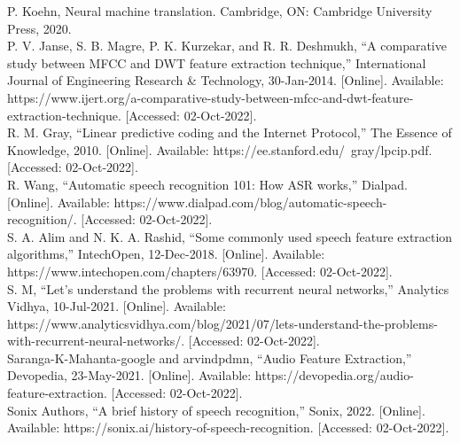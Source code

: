 \newline
P. Koehn, Neural machine translation. Cambridge, ON: Cambridge University Press, 2020.  \\
\newline
P. V. Janse, S. B. Magre, P. K. Kurzekar, and R. R. Deshmukh, “A comparative study between MFCC and DWT feature extraction technique,” International Journal of Engineering Research \& Technology, 30-Jan-2014. [Online]. \newline Available: https://www.ijert.org/a-comparative-study-between-mfcc-and-dwt-feature-extraction-technique. [Accessed: 02-Oct-2022]. \\
\newline
R. M. Gray, “Linear predictive coding and the Internet Protocol,” The Essence of Knowledge, 2010. [Online]. Available: https://ee.stanford.edu/~gray/lpcip.pdf. [Accessed: 02-Oct-2022]. \\
\newline
R. Wang, “Automatic speech recognition 101: How ASR works,” Dialpad. [Online]. Available: https://www.dialpad.com/blog/automatic-speech-recognition/. [Accessed: 02-Oct-2022]. \\
\newline
S. A. Alim and N. K. A. Rashid, “Some commonly used speech feature extraction algorithms,” IntechOpen, 12-Dec-2018. [Online]. \newline Available: https://www.intechopen.com/chapters/63970. [Accessed: 02-Oct-2022]. \\
\newline
S. M, “Let's understand the problems with recurrent neural networks,” Analytics Vidhya, 10-Jul-2021. [Online]. \newline Available: https://www.analyticsvidhya.com/blog/2021/07/lets-understand-the-problems-with-recurrent-neural-networks/. [Accessed: 02-Oct-2022]. \\
\newline
Saranga-K-Mahanta-google and arvindpdmn, “Audio Feature Extraction,” Devopedia, 23-May-2021. [Online]. \newline Available: https://devopedia.org/audio-feature-extraction. [Accessed: 02-Oct-2022]. \\
\newline
Sonix Authors, “A brief history of speech recognition,” Sonix, 2022. [Online]. \newline Available: https://sonix.ai/history-of-speech-recognition. [Accessed: 02-Oct-2022]. \\
\newline
